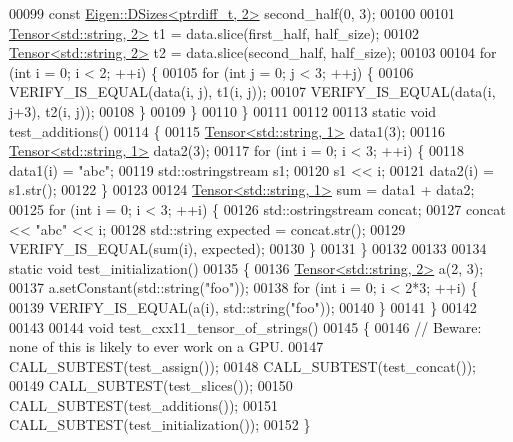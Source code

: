 \begin{DoxyCode}
00099   \textcolor{keyword}{const} \hyperlink{struct_eigen_1_1_d_sizes}{Eigen::DSizes<ptrdiff\_t, 2>} second\_half(0, 3);
00100 
00101   \hyperlink{class_eigen_1_1_tensor}{Tensor<std::string, 2>} t1 = data.slice(first\_half, half\_size);
00102   \hyperlink{class_eigen_1_1_tensor}{Tensor<std::string, 2>} t2 = data.slice(second\_half, half\_size);
00103 
00104   \textcolor{keywordflow}{for} (\textcolor{keywordtype}{int} i = 0; i < 2; ++i) \{
00105     \textcolor{keywordflow}{for} (\textcolor{keywordtype}{int} j = 0; j < 3; ++j) \{
00106       VERIFY\_IS\_EQUAL(data(i, j),   t1(i, j));
00107       VERIFY\_IS\_EQUAL(data(i, j+3), t2(i, j));
00108     \}
00109   \}
00110 \}
00111 
00112 
00113 \textcolor{keyword}{static} \textcolor{keywordtype}{void} test\_additions()
00114 \{
00115   \hyperlink{class_eigen_1_1_tensor}{Tensor<std::string, 1>} data1(3);
00116   \hyperlink{class_eigen_1_1_tensor}{Tensor<std::string, 1>} data2(3);
00117   \textcolor{keywordflow}{for} (\textcolor{keywordtype}{int} i = 0; i < 3; ++i) \{
00118     data1(i) = \textcolor{stringliteral}{"abc"};
00119     std::ostringstream s1;
00120     s1 << i;
00121     data2(i) = s1.str();
00122   \}
00123 
00124   \hyperlink{class_eigen_1_1_tensor}{Tensor<std::string, 1>} sum = data1 + data2;
00125   \textcolor{keywordflow}{for} (\textcolor{keywordtype}{int} i = 0; i < 3; ++i) \{
00126     std::ostringstream concat;
00127     concat << \textcolor{stringliteral}{"abc"} << i;
00128     std::string expected = concat.str();
00129     VERIFY\_IS\_EQUAL(sum(i), expected);
00130   \}
00131 \}
00132 
00133 
00134 \textcolor{keyword}{static} \textcolor{keywordtype}{void} test\_initialization()
00135 \{
00136   \hyperlink{class_eigen_1_1_tensor}{Tensor<std::string, 2>} a(2, 3);
00137   a.setConstant(std::string(\textcolor{stringliteral}{"foo"}));
00138   \textcolor{keywordflow}{for} (\textcolor{keywordtype}{int} i = 0; i < 2*3; ++i) \{
00139     VERIFY\_IS\_EQUAL(a(i), std::string(\textcolor{stringliteral}{"foo"}));
00140   \}
00141 \}
00142 
00143 
00144 \textcolor{keywordtype}{void} test\_cxx11\_tensor\_of\_strings()
00145 \{
00146   \textcolor{comment}{// Beware: none of this is likely to ever work on a GPU.}
00147   CALL\_SUBTEST(test\_assign());
00148   CALL\_SUBTEST(test\_concat());
00149   CALL\_SUBTEST(test\_slices());
00150   CALL\_SUBTEST(test\_additions());
00151   CALL\_SUBTEST(test\_initialization());
00152 \}
\end{DoxyCode}
